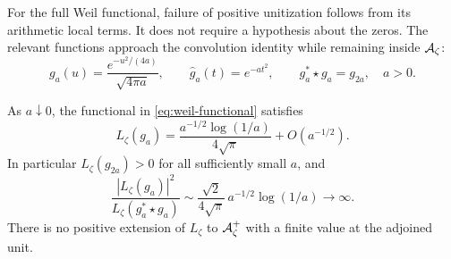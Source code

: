 For the full Weil functional, failure of positive unitization follows
from its arithmetic local terms.  It does not require a hypothesis about
the zeros.  The relevant functions approach the convolution identity
while remaining inside $\mathcal A_\zeta$:
\begin{equation}
 g_a(u)=\frac{e^{-u^2/(4a)}}{\sqrt{4\pi a}},
 \qquad \widehat g_a(t)=e^{-at^2},
 \qquad g_a^*\star g_a=g_{2a},\quad a>0.
 \label{eq:gaussian-semigroup}
\end{equation}

\begin{theorem}
\label{thm:weil-mass}
As $a\downarrow0$, the functional in \eqref{eq:weil-functional} satisfies
\begin{equation}
 L_\zeta(g_a)
 =\frac{a^{-1/2}\log(1/a)}{4\sqrt\pi}+O(a^{-1/2}).
 \label{eq:weil-gaussian-asymptotic}
\end{equation}
In particular $L_\zeta(g_{2a})>0$ for all sufficiently small $a$, and
\begin{equation}
 \frac{|L_\zeta(g_a)|^2}{L_\zeta(g_a^*\star g_a)}
 \sim\frac{\sqrt2}{4\sqrt\pi}\,a^{-1/2}\log(1/a)
 \longrightarrow\infty.
 \label{eq:weil-unitization-divergence}
\end{equation}
There is no positive extension of $L_\zeta$ to $\mathcal A_\zeta^+$ with a
finite value at the adjoined unit.
\end{theorem}

